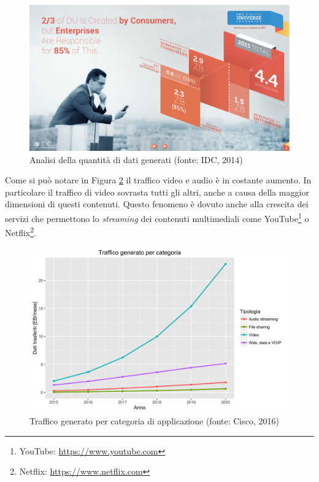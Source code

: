 \begin{figure}[ht]
	\centering
	\includegraphics[width=\textwidth]{1-introduzione/Immagini/dati-generati-consumer.pdf}
	\caption[Analisi della quantità di dati generati]{Analisi della quantità di dati generati (fonte: IDC, 2014)\label{fig:analisi-dati-generati}}
\end{figure}

Come si può notare in Figura \ref{fig:traffico-categoria-applicazione} il traffico video e audio è in costante aumento. In particolare il traffico di video sovrasta tutti gli altri, anche a causa della maggior dimensioni di questi contenuti. Questo fenomeno è dovuto anche alla crescita dei servizi che permettono lo \emph{streaming} dei contenuti multimediali come YouTube\footnote{YouTube: \url{https://www.youtube.com}} o Netflix\footnote{Netflix: \url{https://www.netflix.com}}.

\begin{figure}[ht]
	\centering
	\includegraphics[width=\textwidth]{1-introduzione/Immagini/traffico-categoria.png}
	\caption[Traffico generato per categoria di applicazione]{Traffico generato per categoria di applicazione (fonte: Cisco, 2016)\label{fig:traffico-categoria-applicazione}}
\end{figure}

